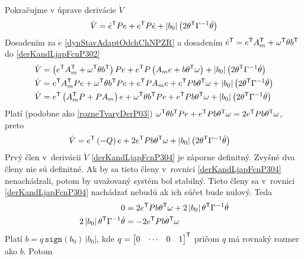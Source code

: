 \documentclass[a4paper, 10pt, ]{article}
\begin{document}
Pokračujme v úprave derivácie $\dot{V}$
\begin{align} \label{derKandLjapFcnP302}
    \dot{V} = \dot{e}^{\mathsf{T}} P e + e^{\mathsf{T}} P \dot{e} + \left| b_0 \right| \left( 2 \theta^{\mathsf{T}} \Gamma^{-1} \dot \theta \right)
\end{align}
Dosadením za $\dot{e}$ \eqref{dynStavAdaptOdchChNPZR} a dosadením $\dot{e}^{\mathsf{T}} = e^{\mathsf{T}} A_m^{\mathsf{T}} + \omega^{\mathsf{T}} \theta b^{\mathsf{T}}$ do \eqref{derKandLjapFcnP302}
\begin{align}	 \label{derKandLjapFcnP303}
    \dot{V} &= \left( e^{\mathsf{T}} A_m^{\mathsf{T}} + \omega^{\mathsf{T}} \theta b^{\mathsf{T}} \right) P e + e^{\mathsf{T}} P \left( A_m e + b \theta^{\mathsf{T}} \omega \right) + \left| b_0 \right| \left( 2 \theta^{\mathsf{T}} \Gamma^{-1} \dot \theta \right) \\
    \dot{V} &= e^{\mathsf{T}} A_m^{\mathsf{T}} P e + \omega^{\mathsf{T}} \theta b^{\mathsf{T}} P e + e^{\mathsf{T}} P A_m e + e^{\mathsf{T}} P b \theta^{\mathsf{T}} \omega 	+ \left| b_0 \right| \left( 2 \theta^{\mathsf{T}} \Gamma^{-1} \dot \theta \right) \\
    \dot{V} &= e^{\mathsf{T}} \left( A_m^{\mathsf{T}} P + P A_m \right) e + \omega^{\mathsf{T}} \theta b^{\mathsf{T}} P e + e^{\mathsf{T}} P b \theta^{\mathsf{T}} \omega 	+ \left| b_0 \right| \left( 2 \theta^{\mathsf{T}} \Gamma^{-1} \dot \theta \right)
\end{align}
Platí (podobne ako \eqref{rozneTvaryDerP03}) $\omega^{\mathsf{T}} \theta b^{\mathsf{T}} P e + e^{\mathsf{T}} P b \theta^{\mathsf{T}} \omega = 2 e^{\mathsf{T}} P b  \theta^{\mathsf{T}} \omega$, preto
\begin{align}	 \label{derKandLjapFcnP304}
    \dot{V} &= e^{\mathsf{T}} \left( - Q \right) e + 2 e^{\mathsf{T}} P b \theta^{\mathsf{T}} \omega + \left| b_0 \right| \left( 2 \theta^{\mathsf{T}} \Gamma^{-1} \dot \theta \right)
\end{align}
Prvý člen v~derivácii $\dot{V}$ \eqref{derKandLjapFcnP304} je záporne definitný. Zvyšné dva členy nie sú definitné. Ak by sa tieto členy v~rovnici \eqref{derKandLjapFcnP304} nenachádzali, potom by uvažovaný systém bol stabilný. Tieto členy sa v~rovnici \eqref{derKandLjapFcnP304} nachádzať nebudú ak ich súčet bude nulový. Teda
\begin{subequations}
    \begin{align}
        0 &= 2 e^{\mathsf{T}} P b \theta^{\mathsf{T}} \omega + 2 \left| b_0 \right| \theta^{\mathsf{T}} \Gamma^{-1} \dot \theta \\
        2 \left| b_0 \right| \theta^{\mathsf{T}} \Gamma^{-1} \dot \theta &= - 2 e^{\mathsf{T}} P b \theta^{\mathsf{T}} \omega
    \end{align}
\end{subequations}
Platí $b = q \, \texttt{sign}(b_0) \, \left| b_0 \right|$, kde $q = \begin{bmatrix} 0 & \cdots & 0 & 1 \end{bmatrix}^{\mathsf{T}}$ pričom $q$ má rovnaký rozmer ako $b$. Potom
\end{document}
